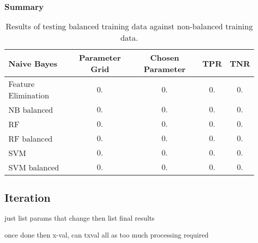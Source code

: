         \subsubsection{Summary}
        \label{subsubsec:exp-clf-opt-summ}
            \begin{wraptable}{l}{0.3\textwidth}
                \scriptsize
                \singlespacing
                \centering
                    \begin{tabular}{ |l|c|c|c|c| } 
                        \hline
                        \textbf{Naive Bayes} & Parameter Grid & Chosen Parameter & TPR & TNR \\ 
                        \hline
                        \hline
                        Feature Elimination & $0.$ & $0.$  & $0.$ & $0.$\\
                        NB balanced & $0.$ & $0.$ & $0.$ & $0.$\\
                        \hline
                        RF          & $0.$ & $0.$ & $0.$ & $0.$\\
                        RF balanced & $0.$ & $0.$ & $0.$ & $0.$\\
                        \hline
                        SVM          & $0.$ & $0.$ & $0.$ & $0.$\\
                        SVM balanced & $0.$ & $0.$ & $0.$ & $0.$\\
                        \hline
                    
                    \end{tabular}
                \caption{Results of testing balanced training data against non-balanced training data.}
                \label{fig:exp-clf-opt-summ-tbl}
            \end{wraptable}
            
    \subsection{Iteration}
    \label{subsec:exp-clf-iter}
        just list params that change then list final results

        once done then x-val, can txval all as too much processing required


            
